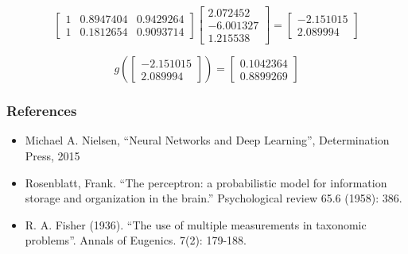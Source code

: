 \documentclass{beamer}
\begin{document}
\begin{frame}
    \[
        \begin{bmatrix}
            1 & 0.8947404 & 0.9429264\\
            1 & 0.1812654 & 0.9093714
        \end{bmatrix}
        \begin{bmatrix}
            2.072452\\
            -6.001327\\
            1.215538
        \end{bmatrix}=
        \begin{bmatrix}
            -2.151015\\
            2.089994
        \end{bmatrix}
    \]
    
    \[
        g\left( 
        \begin{bmatrix}
            -2.151015\\
            2.089994
        \end{bmatrix}
        \right) = 
        \begin{bmatrix}
            0.1042364\\
            0.8899269
        \end{bmatrix}
    \]

\end{frame}

\begin{frame}
    \frametitle{References}

    \begin{itemize}
        \item Michael A. Nielsen, “Neural Networks and Deep Learning”, Determination Press, 2015
        \item Rosenblatt, Frank. “The perceptron: a probabilistic model for information storage and organization in the brain.” Psychological review 65.6 (1958): 386.
        \item R. A. Fisher (1936). “The use of multiple measurements in taxonomic problems”. Annals of Eugenics. 7(2): 179-188. 
    \end{itemize}

\end{frame}
\end{document}
